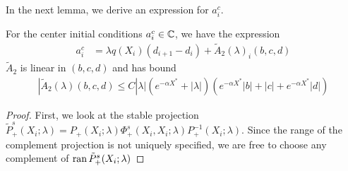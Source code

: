 \documentclass[thesis.tex]{subfiles}
\begin{document}
In the next lemma, we derive an expression for $a_i^c$.

\begin{lemma}\label{lemma:ac1}
For the center initial conditions $a_i^c \in \mathbb{C}$, we have the expression
\begin{align}\label{tildeciexp1}
a_i^c &= \lambda q(X_i) (d_{i+1} - d_i ) + \tilde{A}_2(\lambda)_i(b, c, d)
\end{align}
$\tilde{A}_2$ is linear in $(b, c, d)$ and has bound
\begin{align}\label{tildeA2bound}
|\tilde{A}_2(\lambda)(b, c, d) \leq C |\lambda| ( e^{-\alpha X^*} + |\lambda|) \left( e^{-\alpha X^*}  |b| + |c| + e^{-\alpha X^*} |d| \right)
\end{align}

\begin{proof}
First, we look at the stable projection $\tilde{P}^s_+(X_i; \lambda) = P_+(X_i; \lambda) \Phi^s_+(X_i, X_i; \lambda) P_+^{-1}(X_i; \lambda)$. Since the range of the complement projection is not uniquely specified, we are free to choose any complement of $\operatorname{ran} \tilde{P}^s_+(X_i; \lambda)$ 




\end{proof}
\end{lemma}
\end{document}
